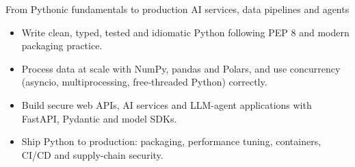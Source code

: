 
{From Pythonic fundamentals to production AI services, data pipelines and agents}

\begin{itemize}
\item Write clean, typed, tested and idiomatic Python following PEP 8 and modern packaging practice.
\item Process data at scale with NumPy, pandas and Polars, and use concurrency (asyncio, multiprocessing, free-threaded Python) correctly.
\item Build secure web APIs, AI services and LLM-agent applications with FastAPI, Pydantic and model SDKs.
\item Ship Python to production: packaging, performance tuning, containers, CI/CD and supply-chain security.
\end{itemize}

